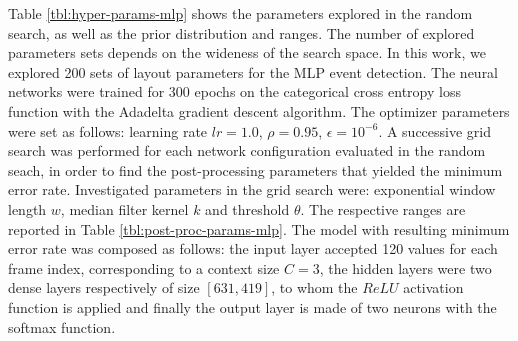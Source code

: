 \documentclass{article}
\begin{document}
\begin{sloppy}

Table \ref{tbl:hyper-params-mlp} shows the parameters explored in the random search, as well as the prior distribution and ranges. 
The number of explored parameters sets depends on the wideness of the search space. In this work, we explored 200 sets of layout parameters for the MLP event detection. The neural networks were trained for 300 epochs on the categorical cross entropy loss function with the Adadelta gradient descent algorithm. The optimizer parameters were set as follows: learning rate $lr=1.0$, $\rho=0.95$, $\epsilon=10^{-6}$.
A successive grid search was performed for each network configuration evaluated in the random seach, in order to find the post-processing parameters that yielded the minimum error rate. Investigated parameters in the grid search were: exponential window length $w$, median filter kernel $k$ and threshold $\theta$. The respective ranges are reported in Table \ref{tbl:post-proc-params-mlp}. The model with resulting minimum error rate was composed as follows: the input layer accepted 120 values for each frame index, corresponding to a context size $C=3$, the hidden layers were two dense layers respectively of size $[631,419]$, to whom the $ReLU$ activation function is applied and finally the output layer is made of two neurons with the softmax function.


\end{sloppy}
\end{document}
